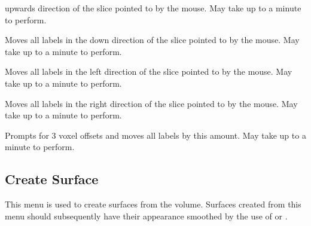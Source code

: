 \begin{description}
    upwards direction of the slice pointed to by the mouse.  May take
    up to a minute to perform.
\item[\menutwo{Segmenting}{Trans v}]  Moves all labels in the
    down direction of the slice pointed to by the mouse.  May take
    up to a minute to perform.
\item[\menutwo{Segmenting}{Trans <}]  Moves all labels in the
    left direction of the slice pointed to by the mouse.  May take
    up to a minute to perform.
\item[\menutwo{Segmenting}{Trans >}]  Moves all labels in the
    right direction of the slice pointed to by the mouse.  May take
    up to a minute to perform.
\item[\menutwo{Segmenting}{Big Translate}]  Prompts for 3 voxel
    offsets and moves all labels by this amount.
    May take up to a minute to perform.
\end{description}

\subsection{Create Surface}

This menu is used to create surfaces from the volume.  Surfaces created
from this menu should subsequently have their appearance smoothed by
the use of  or
.

